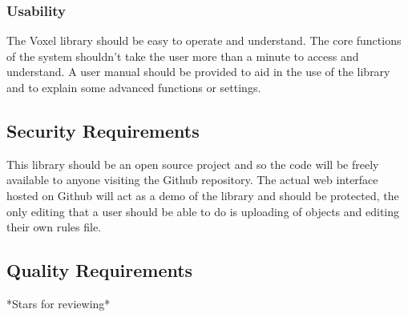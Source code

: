 \documentclass[english]{article}
\begin{document}
		\subsubsection{Usability}
		The Voxel library should be easy to operate and understand. The core functions of the system shouldn't take the user more 
		than a minute to access and understand. A user manual should be provided to aid in the use of the library and to explain some advanced functions or settings.
		
		\subsection{Security Requirements}
		This library should be an open source project and so the code will be freely available to anyone visiting the Github repository. The actual web interface hosted on Github will act as a demo of the library and should be protected, the only editing that a user should be able to do is uploading of objects and editing their own rules file.
		
		\subsection{Quality Requirements}
		*Stars for reviewing*
		
	\pagebreak
	
\end{document}

